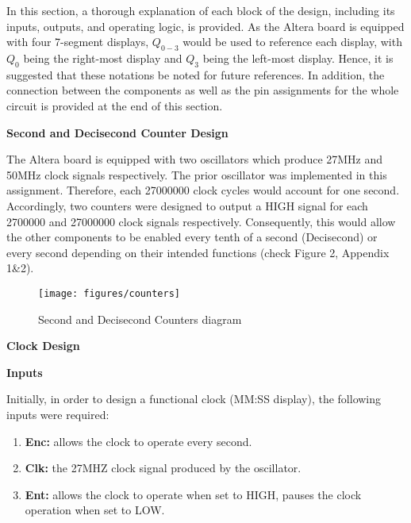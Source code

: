 \documentclass[12pt,a4paper]{article}
\begin{document}
	\noindent In this section, a thorough explanation of each block of the design, including its inputs, outputs, and operating logic, is provided. As the Altera board is equipped with four 7-segment displays, $Q_{0-3}$ would be used to reference each display, with $Q_{0}$ being the right-most display and $Q_{3}$ being the left-most display. Hence, it is suggested that these notations be noted for future references. In addition, the connection between the components as well as the pin assignments for the whole circuit is provided at the end of this section. 
	
	\vspace{0.5cm}
	
	\noindent \textbf{\large Second and Decisecond Counter Design}
	\vspace{0.2cm}
	
	\noindent The Altera board is equipped with two oscillators which produce 27MHz and 50MHz clock signals respectively. The prior oscillator was implemented in this assignment. Therefore, each 27000000 clock cycles would account for one second. Accordingly, two counters were designed to output a HIGH signal for each 2700000 and 27000000 clock signals respectively. Consequently, this would allow the other components to be enabled every tenth of a second (Decisecond) or every second depending on their intended functions (check Figure 2, Appendix 1\&2).
	
	\begin{figure}[H]
		\centering
		\texttt{[image: figures/counters]}
		\caption{Second and Decisecond Counters diagram}
	\end{figure}

	\vspace{-0.3cm}	
	\noindent \textbf{\large Clock Design}
	\vspace{0.2cm}
	
	\noindent \textbf{Inputs}
	\vspace{0.1cm}
	
	\noindent Initially, in order to design a functional clock (MM:SS display), the following inputs were required:
	
	\vspace{-0.2cm}
	\begin{enumerate}
		\item \textbf{Enc:} allows the clock to operate every second.
		\item \textbf{Clk:} the 27MHZ clock signal produced by the oscillator.
		\item \textbf{Ent:} allows the clock to operate when set to HIGH, pauses the clock operation when set to LOW. 
	\end{enumerate}
\end{document}
